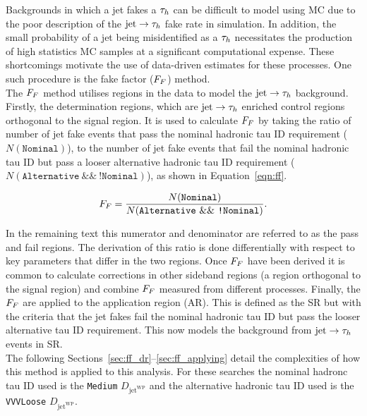 Backgrounds in which a jet fakes a $\tau_{h}$ can be difficult to model using MC due to the poor description of the $\text{jet}\rightarrow\tau_{h}$ fake rate in simulation. 
In addition, the small probability of a jet being misidentified as a $\tau_{h}$ necessitates the production of high statistics MC samples at a significant computational expense.
These shortcomings motivate the use of data-driven estimates for these processes. 
One such procedure is the fake factor ($F_{F}$) method. \\

The $F_{F}$ method utilises regions in the data to model the $\text{jet}\rightarrow\tau_{h}$ background. 
Firstly, the determination regions, which are $\text{jet}\rightarrow\tau_{h}$ enriched control regions orthogonal to the signal region. 
It is used to calculate $F_{F}$ by taking the ratio of number of jet fake events that pass the nominal hadronic tau ID requirement ($N(\texttt{Nominal})$), to the number of jet fake events that fail the nominal hadronic tau ID but pass a looser alternative hadronic tau ID requirement ($N(\texttt{Alternative}~\&\&~\texttt{!Nominal})$), as shown in Equation~\ref{eqn:ff}.

\begin{equation}
F_{F} = \frac{N(\texttt{Nominal})}{N(\texttt{Alternative}~\&\&~\texttt{!Nominal})}.
\label{eqn:ff}
\end{equation}

In the remaining text this numerator and denominator are referred to as the pass and fail regions.
The derivation of this ratio is done differentially with respect to key parameters that differ in the two regions.
Once $F_{F}$ have been derived it is common to calculate corrections in other sideband regions (a region orthogonal to the signal region) and combine $F_{F}$ measured from different processes.
Finally, the $F_{F}$ are applied to the application region (AR). 
This is defined as the SR but with the criteria that the jet fakes fail the nominal hadronic tau ID but pass the looser alternative tau ID requirement.
This now models the background from $\text{jet}\rightarrow\tau_{h}$ events in SR. \\

The following Sections~\ref{sec:ff_dr}--\ref{sec:ff_applying} detail the complexities of how this method is applied to this analysis.
For these searches the nominal hadronc tau ID used is the \texttt{Medium} $D_{\text{jet}^{\text{WP}}}$ and the alternative hadronic tau ID used is the \texttt{VVVLoose}  $D_{\text{jet}^{\text{WP}}}$.

